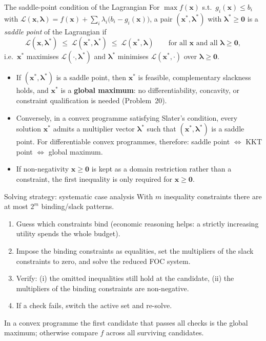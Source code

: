 \begin{rulebox}{The saddle-point condition of the Lagrangian}
For $\max f(\mathbf{x})$ s.t.\ $g_i(\mathbf{x}) \leq b_i$ with
$\mathcal{L}(\mathbf{x}, \boldsymbol{\lambda})
= f(\mathbf{x}) + \sum_i \lambda_i\bigl(b_i - g_i(\mathbf{x})\bigr)$, a
pair $(\mathbf{x}^*, \boldsymbol{\lambda}^*)$ with
$\boldsymbol{\lambda}^* \geq \mathbf{0}$ is a \emph{saddle point} of the Lagrangian if
\[
  \mathcal{L}(\mathbf{x}, \boldsymbol{\lambda}^*)
  \;\leq\; \mathcal{L}(\mathbf{x}^*, \boldsymbol{\lambda}^*)
  \;\leq\; \mathcal{L}(\mathbf{x}^*, \boldsymbol{\lambda})
  \qquad \text{for all } \mathbf{x}
  \text{ and all } \boldsymbol{\lambda} \geq \mathbf{0},
\]
i.e.\ $\mathbf{x}^*$ maximises $\mathcal{L}(\cdot, \boldsymbol{\lambda}^*)$
and $\boldsymbol{\lambda}^*$ minimises
$\mathcal{L}(\mathbf{x}^*, \cdot)$ over
$\boldsymbol{\lambda} \geq \mathbf{0}$.
\begin{itemize}[leftmargin=1.6em,itemsep=0.3ex]
  \item If $(\mathbf{x}^*, \boldsymbol{\lambda}^*)$ is a saddle point, then
        $\mathbf{x}^*$ is feasible, complementary slackness holds, and
        $\mathbf{x}^*$ is a \textbf{global maximum}: no differentiability,
        concavity, or constraint qualification is needed (Problem~20).
  \item Conversely, in a convex programme satisfying Slater's condition,
        every solution $\mathbf{x}^*$ admits a multiplier vector
        $\boldsymbol{\lambda}^*$ such that
        $(\mathbf{x}^*, \boldsymbol{\lambda}^*)$ is a saddle point. For
        differentiable convex programmes, therefore: saddle point
        $\Leftrightarrow$ KKT point $\Leftrightarrow$ global maximum.
  \item If non-negativity $\mathbf{x} \geq \mathbf{0}$ is kept as a domain
        restriction rather than a constraint, the first inequality is only
        required for $\mathbf{x} \geq \mathbf{0}$.
\end{itemize}
\end{rulebox}

\begin{rulebox}{Solving strategy: systematic case analysis}
With $m$ inequality constraints there are at most $2^m$ binding/slack
patterns.
\begin{enumerate}[leftmargin=1.8em,itemsep=0.3ex]
  \item Guess which constraints bind (economic reasoning helps: a strictly
        increasing utility spends the whole budget).
  \item Impose the binding constraints as equalities, set the multipliers
        of the slack constraints to zero, and solve the reduced FOC system.
  \item Verify: (i) the omitted inequalities still hold at the candidate,
        (ii) the multipliers of the binding constraints are non-negative.
  \item If a check fails, switch the active set and re-solve.
\end{enumerate}
In a convex programme the first candidate that passes all checks is the
global maximum; otherwise compare $f$ across all surviving candidates.
\end{rulebox}

